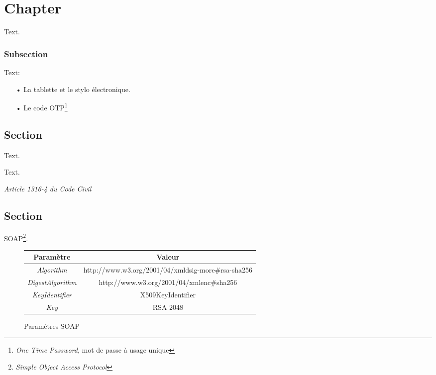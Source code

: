 \chapter{Chapter}

Text. 

\newpage
\subsection{Subsection}

Text:\\

\begin{itemize}
	\item[•]La tablette et le stylo électronique.
	\item[•]Le code OTP\footnote{\textit{One Time Password}, mot de passe à usage unique} 
\end{itemize}

\section{Section}

Text.

\begin{formal}
	Text.
	\begin{flushright}
		\textit{Article 1316-4 du Code Civil}
	\end{flushright}
\end{formal}

\newpage

\section{Section}

SOAP\footnote{\textit{Simple Object Access Protocol}}. \\

{\renewcommand{\arraystretch}{1.3}
\begin{figure}
	\begin{tabular}{|c|c|}
		\hline
			\rowcolor{darkblue}
			\color{white}Paramètre & \color{white}Valeur \\
		\hline
			\textit{Algorithm} & http://www.w3.org/2001/04/xmldsig-more\#rsa-sha256 \\
		\hline
			\textit{DigestAlgorithm} & http://www.w3.org/2001/04/xmlenc\#sha256 \\
		\hline
			\textit{KeyIdentifier} & X509KeyIdentifier \\
		\hline
			\textit{Key} & RSA 2048 \\
		\hline
	\end{tabular}
	\caption{Paramètres SOAP}
\end{figure}}
